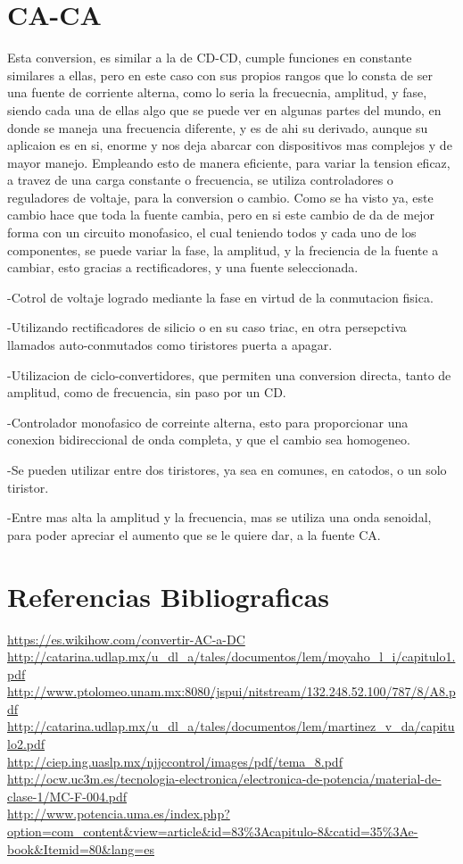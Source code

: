 \documentclass[12pt]{article}
\begin{document}
 \section{CA-CA}
 Esta conversion, es similar a la de CD-CD, cumple funciones en constante similares a ellas, pero en este caso con sus propios rangos que lo consta de ser una fuente de corriente alterna, como lo seria la frecuecnia, amplitud, y fase, siendo cada una de ellas algo que se puede ver en algunas partes del mundo, en donde se maneja una frecuencia diferente, y es de ahi su derivado, aunque su aplicaion es en si, enorme y nos deja abarcar con dispositivos mas complejos y de mayor manejo. Empleando esto de manera eficiente, para variar la tension eficaz, a travez de una carga constante o frecuencia, se utiliza controladores o reguladores de voltaje, para la conversion o cambio. Como se ha visto ya, este cambio hace que toda la fuente cambia, pero en si este cambio de da de mejor forma con un circuito monofasico, el cual teniendo todos y cada uno de los componentes, se puede variar la fase, la amplitud, y la freciencia de la fuente a cambiar, esto gracias a rectificadores, y una fuente seleccionada.
 
 -Cotrol de voltaje logrado mediante la fase en virtud de la conmutacion fisica.
 
 -Utilizando rectificadores de silicio o en su caso triac, en otra persepctiva llamados auto-conmutados como tiristores puerta a apagar.
 
 -Utilizacion de ciclo-convertidores, que permiten una conversion directa, tanto de amplitud, como de frecuencia, sin paso por un CD.
 
 -Controlador monofasico de correinte alterna, esto para proporcionar una conexion bidireccional de onda completa, y que el cambio sea homogeneo.
 
 -Se pueden utilizar entre dos tiristores, ya sea en comunes, en catodos, o un solo tiristor.
 
 -Entre mas alta la amplitud y la frecuencia, mas se utiliza una onda senoidal, para poder apreciar el aumento que se le quiere dar, a la fuente CA. 
 
 
 \newpage{}
 \section{Referencias Bibliograficas}
 
 \url{https://es.wikihow.com/convertir-AC-a-DC}\\
 \url{http://catarina.udlap.mx/u_dl_a/tales/documentos/lem/moyaho_l_i/capitulo1.pdf}\\
 \url{http://www.ptolomeo.unam.mx:8080/jspui/nitstream/132.248.52.100/787/8/A8.pdf}\\
 \url{http://catarina.udlap.mx/u_dl_a/tales/documentos/lem/martinez_v_da/capitulo2.pdf}\\
 \url{http://ciep.ing.uaslp.mx/njjccontrol/images/pdf/tema_8.pdf}\\
 \url{http://ocw.uc3m.es/tecnologia-electronica/electronica-de-potencia/material-de-clase-1/MC-F-004.pdf}\\
 \url{http://www.potencia.uma.es/index.php?option=com_content&view=article&id=83%3Acapitulo-8&catid=35%3Ae-book&Itemid=80&lang=es}
 
\end{document}
